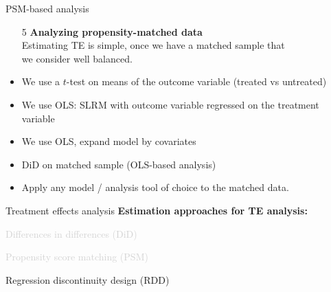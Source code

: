 \documentclass{beamer}
\begin{document}
\begin{frame}{PSM-based analysis}
\begin{enumerate}
    \item[5] \textbf{Analyzing propensity-matched data} \\ \medskip
    Estimating TE is simple, once we have a matched sample that \\we consider well balanced. 
\end{enumerate}
\medskip
\begin{itemize}
    \item We use a $t$-test on means of the outcome variable (treated vs untreated)
    \smallskip
    \item We use OLS: SLRM with outcome variable regressed on the treatment variable
    \smallskip
    \item We use OLS, expand model by covariates
    \smallskip
    \item DiD on matched sample (OLS-based analysis)
    \smallskip
    \item Apply any model / analysis tool of choice to the matched data.
\end{itemize}    
\end{frame}
% 
\begin{frame}{Treatment effects analysis}
\textbf{Estimation approaches for TE analysis:}\\
\bigskip
\begin{enumerate}
    \item \textcolor{lightgray}{Differences in differences (DiD)
    \bigskip
    \item Propensity score matching (PSM)}
    \bigskip
    \item Regression discontinuity design (RDD)
\end{enumerate}
\end{frame}
\end{document}
